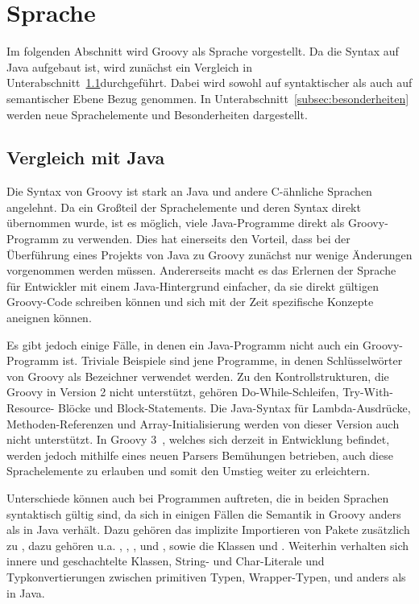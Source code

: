 \documentclass[11pt,a4paper]{article}
\title{\paperTitle}
\author{\paperAuthor}
\date{\paperDate}
\begin{document}

	\section{Sprache}\label{sec:sprache}

	Im folgenden Abschnitt wird Groovy als Sprache vorgestellt.
	Da die Syntax auf Java aufgebaut ist, wird zunächst ein Vergleich in Unterabschnitt~\ref{subsec:vergleichMitJava}durchgeführt.
	Dabei wird sowohl auf syntaktischer als auch auf semantischer Ebene Bezug genommen.
	In Unterabschnitt~\ref{subsec:besonderheiten} werden neue Sprachelemente und Besonderheiten dargestellt.

	\subsection{Vergleich mit Java}\label{subsec:vergleichMitJava}

	Die Syntax von Groovy ist stark an Java und andere C-ähnliche Sprachen angelehnt.
	Da ein Großteil der Sprachelemente und deren Syntax direkt übernommen wurde, ist es möglich, viele Java-Programme direkt als Groovy-Programm zu verwenden.
	Dies hat einerseits den Vorteil, dass bei der Überführung eines Projekts von Java zu Groovy zunächst nur wenige Änderungen vorgenommen werden müssen.
	Andererseits macht es das Erlernen der Sprache für Entwickler mit einem Java-Hintergrund einfacher, da sie direkt gültigen Groovy-Code schreiben können und sich mit der Zeit spezifische Konzepte aneignen können.

	Es gibt jedoch einige Fälle, in denen ein Java-Programm nicht auch ein Groovy-Programm ist.
	Triviale Beispiele sind jene Programme, in denen Schlüsselwörter von Groovy als Bezeichner verwendet werden.
	Zu den Kontrollstrukturen, die Groovy in Version 2 nicht unterstützt, gehören Do-While-Schleifen, Try-With-Resource- Blöcke und Block-Statements.
	Die Java-Syntax für Lambda-Ausdrücke, Methoden-Referenzen und Array-Initialisierung werden von dieser Version auch nicht unterstützt.
	In Groovy 3~\cite{groovy-lang:release3}, welches sich derzeit in Entwicklung befindet, werden jedoch mithilfe eines neuen Parsers Bemühungen betrieben, auch diese Sprachelemente zu erlauben und somit den Umstieg weiter zu erleichtern.

	Unterschiede können auch bei Programmen auftreten, die in beiden Sprachen syntaktisch gültig sind, da sich in einigen Fällen die Semantik in Groovy anders als in Java verhält.
	Dazu gehören das implizite Importieren von Pakete zusätzlich zu , dazu gehören {u.a.} , , ,  und , sowie die Klassen  und .
	Weiterhin verhalten sich innere und geschachtelte Klassen, String- und Char-Literale und Typkonvertierungen zwischen primitiven Typen, Wrapper-Typen,  und  anders als in Java.
\end{document}
